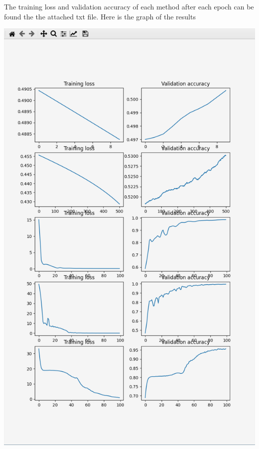 \documentclass{article}
\begin{document}
The training loss and validation accuracy of each method after each epoch can be found the the attached txt file.
Here is the graph of the results

\includegraphics[width=\textwidth]{q5graph}
\end{document}
